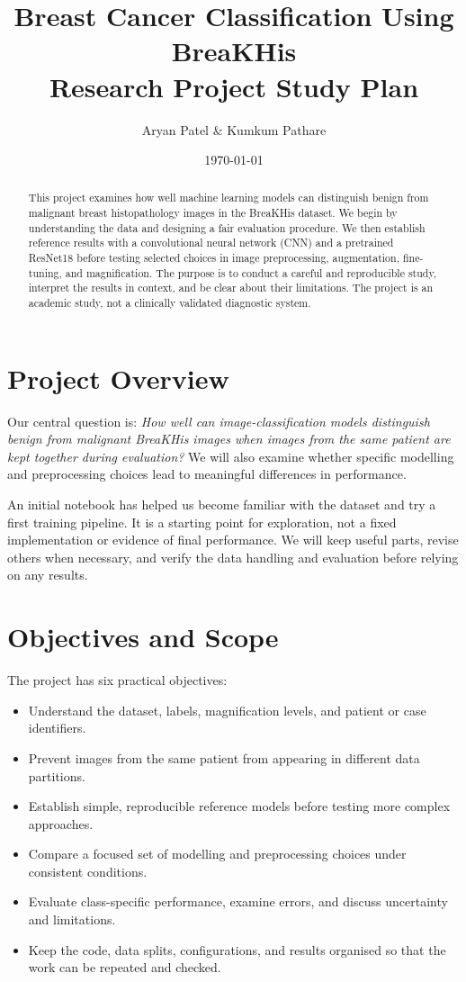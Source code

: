 \documentclass[11pt,a4paper]{article}
\title{\textbf{Breast Cancer Classification Using BreaKHis}\\[0.3em]
\large Research Project Study Plan}
\author{Aryan Patel \& Kumkum Pathare}
\date{\today}
\begin{document}
\maketitle
\thispagestyle{fancy}

\begin{abstract}
This project examines how well machine learning models can distinguish benign from malignant breast histopathology images in the BreaKHis dataset. We begin by understanding the data and designing a fair evaluation procedure. We then establish reference results with a convolutional neural network (CNN) and a pretrained ResNet18 before testing selected choices in image preprocessing, augmentation, fine-tuning, and magnification. The purpose is to conduct a careful and reproducible study, interpret the results in context, and be clear about their limitations. The project is an academic study, not a clinically validated diagnostic system.
\end{abstract}

\section{Project Overview}

Our central question is: \textit{How well can image-classification models distinguish benign from malignant BreaKHis images when images from the same patient are kept together during evaluation?} We will also examine whether specific modelling and preprocessing choices lead to meaningful differences in performance.

An initial notebook has helped us become familiar with the dataset and try a first training pipeline. It is a starting point for exploration, not a fixed implementation or evidence of final performance. We will keep useful parts, revise others when necessary, and verify the data handling and evaluation before relying on any results.

\section{Objectives and Scope}

The project has six practical objectives:
\begin{itemize}
    \item Understand the dataset, labels, magnification levels, and patient or case identifiers.
    \item Prevent images from the same patient from appearing in different data partitions.
    \item Establish simple, reproducible reference models before testing more complex approaches.
    \item Compare a focused set of modelling and preprocessing choices under consistent conditions.
    \item Evaluate class-specific performance, examine errors, and discuss uncertainty and limitations.
    \item Keep the code, data splits, configurations, and results organised so that the work can be repeated and checked.
\end{itemize}
\end{document}

